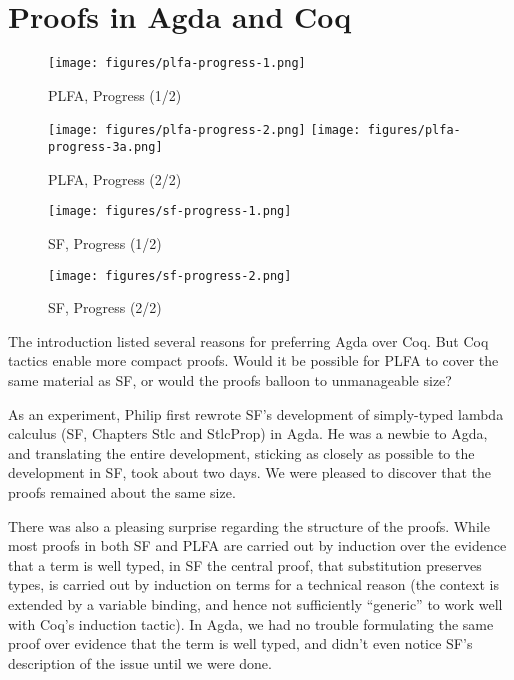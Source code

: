 \documentclass[preprint,authoryear]{elsarticle}
\begin{document}
\section{Proofs in Agda and Coq}

\begin{figure}[t]
  \texttt{[image: figures/plfa-progress-1.png]}
  \caption{PLFA, Progress (1/2)}
  \label{fig:plfa-progress-1}
\end{figure}

\begin{figure}[p]
  \texttt{[image: figures/plfa-progress-2.png]}
  \texttt{[image: figures/plfa-progress-3a.png]}
  \caption{PLFA, Progress (2/2)}
  \label{fig:plfa-progress-2}
\end{figure}

\begin{figure}[t]
  \texttt{[image: figures/sf-progress-1.png]}
  \caption{SF, Progress (1/2)}
  \label{fig:sf-progress-1}
\end{figure}

\begin{figure}[t]
  \texttt{[image: figures/sf-progress-2.png]}
  \caption{SF, Progress (2/2)}
  \label{fig:sf-progress-2}
\end{figure}

The introduction listed several reasons for preferring Agda over Coq.
But Coq tactics enable more compact proofs. Would it be possible for
PLFA to cover the same material as SF, or would the proofs
balloon to unmanageable size?

As an experiment, Philip first rewrote SF's development of simply-typed lambda
calculus (SF, Chapters Stlc and StlcProp) in Agda.  He was a newbie to Agda, and
translating the entire development, sticking as closely as possible to the
development in SF, took about two days.  We were pleased to discover that the
proofs remained about the same size.

There was also a pleasing surprise regarding the structure of the
proofs. While most proofs in both SF and PLFA are carried out by
induction over the evidence that a term is well typed, in SF the
central proof, that substitution preserves types, is carried out by
induction on terms for a technical reason
(the context is extended by a variable binding, and hence not
sufficiently ``generic'' to work well with Coq's induction tactic). In
Agda, we had no trouble formulating the same proof over evidence that
the term is well typed, and didn't even notice SF's description of the
issue until we were done.
\end{document}
